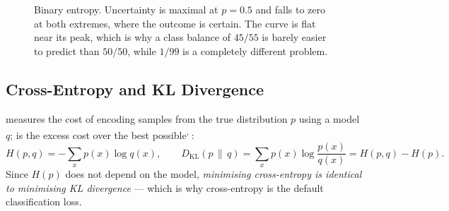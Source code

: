 \begin{figure}[htbp]
\centering
{}
\caption{Binary entropy. Uncertainty is maximal at $p=0.5$ and falls to zero at
both extremes, where the outcome is certain. The curve is flat near its peak,
which is why a class balance of $45/55$ is barely easier to predict than
$50/50$, while $1/99$ is a completely different problem.}
\label{fig:math-binary-entropy}
\end{figure}

\subsection{Cross-Entropy and KL Divergence}

 measures the cost of encoding samples from the true
distribution $p$ using a model $q$;  is the excess cost
over the best possible\textsuperscript{\cite{kullbackInformationSufficiency1951},
\cite[][ch.~2]{coverElementsInformationTheory2006}}:
\begin{equation}
  H(p,q) = -\sum_x p(x)\log q(x),
  \qquad
  D_{\mathrm{KL}}(p\,\|\,q) = \sum_x p(x)\log\frac{p(x)}{q(x)}
  = H(p,q) - H(p).
  \label{eq:math-kl}
\end{equation}
Since $H(p)$ does not depend on the model, \emph{minimising cross-entropy is
identical to minimising KL divergence} --- which is why cross-entropy is the
default classification loss.


